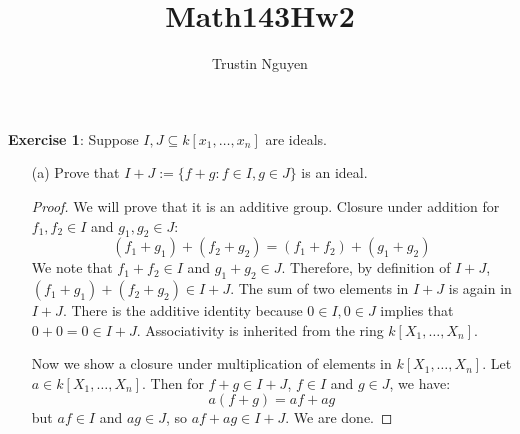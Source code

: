 \documentclass{article}
\title{Math143Hw2}
\author{Trustin Nguyen}
\begin{document}
    \maketitle

\reversemarginpar

\textbf{Exercise 1}: Suppose $I, J \subseteq k[x_{1}, \ldots, x_{n}]$ are ideals.
    \begin{itemize}
        \item [(a)] Prove that $I + J := \{f + g : f \in I, g \in J\}$ is an ideal.
            \begin{proof}
                We will prove that it is an additive group. Closure under addition for $f_{1}, f_{2} \in I$ and $g_{1}, g_{2} \in J$:
                    \begin{equation*}
                        (f_{1} + g_{1}) + (f_{2} + g_{2}) = (f_{1} + f_{2}) + (g_{1} + g_{2})
                    \end{equation*}
                We note that $f_{1} + f_{2} \in I$ and $g_{1} + g_{2} \in J$. Therefore, by definition of $I + J$, $(f_{1} + g_{1}) + (f_{2} + g_{2}) \in I + J$. The sum of two elements in $I + J$ is again in $I + J$. There is the additive identity because $0 \in I, 0 \in J$ implies that $0 + 0 = 0 \in I + J$. Associativity is inherited from the ring $k[X_{1}, \ldots, X_{n}]$. 

                Now we show a closure under multiplication of elements in $k[X_{1}, \ldots, X_{n}]$. Let $a \in k[X_{1}, \ldots, X_{n}]$. Then for $f + g \in I + J$, $f \in I$ and $g \in J$, we have:
                    \begin{equation*}
                        a(f + g) = af + ag
                    \end{equation*}
                but $af \in I$ and $ag \in J$, so $af + ag \in I + J$. We are done.
            \end{proof}


\end{itemize}
\end{document}
